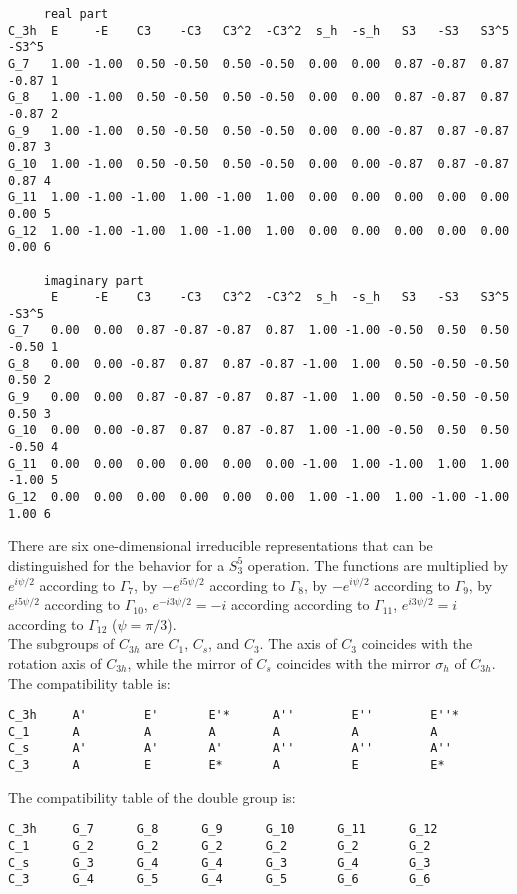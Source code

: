 \documentclass[12pt,a4paper]{article}
\begin{document}
\begin{footnotesize}
\begin{verbatim}
     real part
C_3h  E     -E    C3    -C3   C3^2  -C3^2  s_h  -s_h   S3   -S3   S3^5 -S3^5
G_7   1.00 -1.00  0.50 -0.50  0.50 -0.50  0.00  0.00  0.87 -0.87  0.87 -0.87 1
G_8   1.00 -1.00  0.50 -0.50  0.50 -0.50  0.00  0.00  0.87 -0.87  0.87 -0.87 2
G_9   1.00 -1.00  0.50 -0.50  0.50 -0.50  0.00  0.00 -0.87  0.87 -0.87  0.87 3
G_10  1.00 -1.00  0.50 -0.50  0.50 -0.50  0.00  0.00 -0.87  0.87 -0.87  0.87 4
G_11  1.00 -1.00 -1.00  1.00 -1.00  1.00  0.00  0.00  0.00  0.00  0.00  0.00 5
G_12  1.00 -1.00 -1.00  1.00 -1.00  1.00  0.00  0.00  0.00  0.00  0.00  0.00 6

     imaginary part
      E     -E    C3    -C3   C3^2  -C3^2  s_h  -s_h   S3   -S3   S3^5 -S3^5
G_7   0.00  0.00  0.87 -0.87 -0.87  0.87  1.00 -1.00 -0.50  0.50  0.50 -0.50 1
G_8   0.00  0.00 -0.87  0.87  0.87 -0.87 -1.00  1.00  0.50 -0.50 -0.50  0.50 2
G_9   0.00  0.00  0.87 -0.87 -0.87  0.87 -1.00  1.00  0.50 -0.50 -0.50  0.50 3
G_10  0.00  0.00 -0.87  0.87  0.87 -0.87  1.00 -1.00 -0.50  0.50  0.50 -0.50 4
G_11  0.00  0.00  0.00  0.00  0.00  0.00 -1.00  1.00 -1.00  1.00  1.00 -1.00 5
G_12  0.00  0.00  0.00  0.00  0.00  0.00  1.00 -1.00  1.00 -1.00 -1.00  1.00 6
\end{verbatim}
\end{footnotesize}
There are six one-dimensional irreducible representations that can be
distinguished for the behavior for a $S_3^5$ operation. The functions
are multiplied by $e^{i\psi/2}$ according to $\Gamma_7$, by $-e^{i5\psi/2}$
according to $\Gamma_8$, by $-e^{i\psi/2}$ according to $\Gamma_9$,
by $e^{i5\psi/2}$ according to $\Gamma_{10}$, $e^{-i3\psi/2}=-i$ according
according to $\Gamma_{11}$, $e^{i3\psi/2}=i$ according to $\Gamma_{12}$
($\psi=\pi/3$).\\
The subgroups of $C_{3h}$ are $C_1$, $C_s$, and $C_3$. The axis of $C_3$
coincides with the rotation axis of $C_{3h}$, while the mirror of $C_s$ coincides
with the mirror $\sigma_h$ of $C_{3h}$. \\ 
The compatibility table is:
\begin{verbatim}
C_3h     A'        E'       E'*      A''        E''        E''* 
C_1      A         A        A        A          A          A
C_s      A'        A'       A'       A''        A''        A''
C_3      A         E        E*       A          E          E*
\end{verbatim}
The compatibility table of the double group is:
\begin{verbatim}
C_3h     G_7      G_8      G_9      G_10      G_11      G_12
C_1      G_2      G_2      G_2      G_2       G_2       G_2
C_s      G_3      G_4      G_4      G_3       G_4       G_3
C_3      G_4      G_5      G_4      G_5       G_6       G_6
\end{verbatim}
\end{document}
